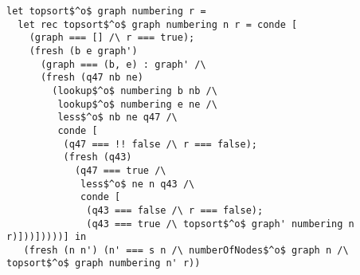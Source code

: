\begin{figure*}[!t]
  \centering
  \begin{minipage}{\textwidth}
    \begin{lstlisting}[label={topsort_rel}, caption={Relational intepreter for topologic sort of a graph}, captionpos=b, frame=tb]
let topsort$^o$ graph numbering r =
  let rec topsort$^o$ graph numbering n r = conde [
    (graph === [] /\ r === true);
    (fresh (b e graph')
      (graph === (b, e) : graph' /\
      (fresh (q47 nb ne)
        (lookup$^o$ numbering b nb /\
         lookup$^o$ numbering e ne /\
         less$^o$ nb ne q47 /\
         conde [
          (q47 === !! false /\ r === false);
          (fresh (q43)
            (q47 === true /\
             less$^o$ ne n q43 /\
             conde [
              (q43 === false /\ r === false);
              (q43 === true /\ topsort$^o$ graph' numbering n r)]))]))))] in
   (fresh (n n') (n' === s n /\ numberOfNodes$^o$ graph n /\ topsort$^o$ graph numbering n' r))
    \end{lstlisting}
  \end{minipage}
\end{figure*}

